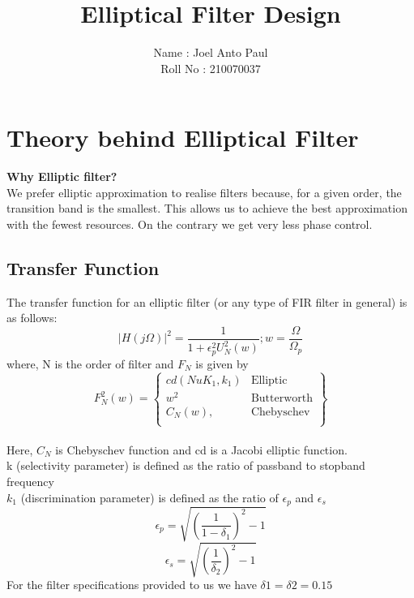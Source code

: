 \documentclass{article}
\title{Elliptical Filter Design}
\author{Name : Joel Anto Paul\\ Roll No : 210070037}
\begin{document}
\maketitle

\section{Theory behind Elliptical Filter}
\textbf{Why Elliptic filter?}\\
We prefer elliptic approximation to realise filters because, for a given order, the transition band is the smallest. This allows us to achieve the best approximation with the fewest resources. On the contrary we get very less phase control.
\subsection{Transfer Function}
The transfer function for an elliptic filter (or any type of FIR filter in general) is as follows:
\begin{equation*}
    |H(j\Omega)|^2 = \frac{1}{1+\epsilon_p^2U_N^2(w)};  w=\frac{\Omega}{\Omega_p}
\end{equation*}
where, N is the order of filter and $F_N$ is given by
\begin{equation*}
F_N^2(w)= 
\left\{
    \begin{array}{lr}
        cd(NuK_1,k_1)&\text{Elliptic}\\
        w^2 & \text{Butterworth} \\
        C_N(w), & \text{Chebyschev} \\        
    \end{array}
\right\}
\end{equation*}\\
Here,
$C_N$ is Chebyschev function and cd is a Jacobi elliptic function.\\
\hspace*{9mm} k (selectivity parameter) is defined as the ratio of passband to stopband frequency\\
\hspace*{9mm} $k_1$ (discrimination parameter) is defined as the ratio of $\epsilon_p$ and $\epsilon_s$
\begin{equation*}
    \epsilon_p = {\sqrt{(\frac{1}{1-\delta_1})^2-1}}
\end{equation*}
\begin{equation*}
    \epsilon_s = {\sqrt{(\frac{1}{\delta_2})^2-1}}
\end{equation*}
For the filter specifications provided to us we have  $\delta1=\delta2=0.15$ \\
\end{document}
